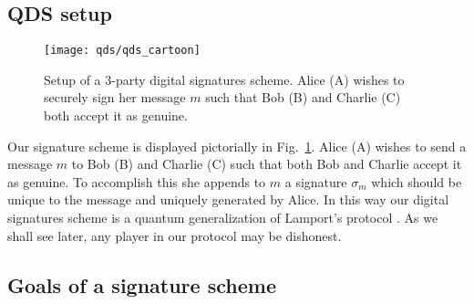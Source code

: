 \subsection{QDS setup}

\begin{figure}[htp]
\centering
\texttt{[image: qds/qds\_cartoon]}
\caption{\label{fig:qds_cartoon} Setup of a $3$-party digital signatures scheme. Alice (A) wishes to securely sign her message $m$ such that Bob (B) and Charlie (C) both accept it as genuine.}
\end{figure}

Our signature scheme is displayed pictorially in Fig.~\ref{fig:qds_cartoon}. Alice (A) wishes to send a message $m$ to Bob (B) and Charlie (C) such that both Bob and Charlie accept it as genuine. To accomplish this she appends to $m$ a signature $\sigma_m$ which should be unique to the message and uniquely generated by Alice. In this way our digital signatures scheme is a quantum generalization of Lamport's protocol \cite{Lamport1979, Schneier1996}. As we shall see later, any player in our protocol may be dishonest.

\subsection{Goals of a signature scheme}\label{sec:qds_goals}




